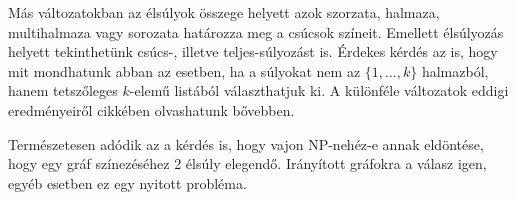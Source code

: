 \documentclass[12pt, a4paper]{report}
\theoremstyle{remark}
\theoremstyle{definition}
\begin{document}
Más változatokban az élsúlyok összege helyett azok szorzata, halmaza, multihalmaza vagy sorozata határozza meg a csúcsok színeit. Emellett élsúlyozás helyett tekinthetünk csúcs-, illetve teljes-súlyozást is. Érdekes kérdés az is, hogy mit mondhatunk abban az esetben, ha a súlyokat nem az $\lbrace 1, \ldots, k \rbrace$ halmazból, hanem tetszőleges $k$-elemű listából választhatjuk ki. A különféle változatok eddigi eredményeiről \citeauthor{Seamone2012} \cite{Seamone2012} cikkében olvashatunk bővebben.

Természetesen adódik az a kérdés is, hogy vajon NP-nehéz-e annak eldöntése, hogy egy gráf színezéséhez 2 élsúly elegendő. Irányított gráfokra a válasz igen, egyéb esetben ez egy nyitott probléma.

\nocite{*}
\printbibliography
\end{document}
